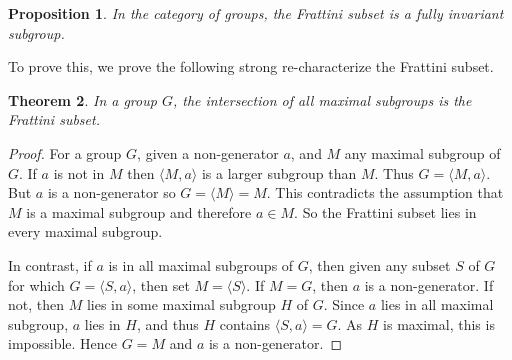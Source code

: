 \documentclass[12pt]{article}
\newtheorem{thm}{Theorem}
\newtheorem{prop}[thm]{Proposition}
\begin{document}
\begin{prop}
In the category of groups, the Frattini subset is a fully invariant subgroup.
\end{prop}

To prove this, we prove the following strong re-characterize the Frattini subset.
\begin{thm}
In a group $G$, the intersection of all maximal subgroups is the 
Frattini subset.
\end{thm}
\begin{proof}
For a group $G$, given a non-generator $a$, and $M$ any maximal subgroup 
of $G$.  If $a$ is not in $M$ then $\langle M,a\rangle$ is a larger subgroup
than $M$.  Thus $G=\langle M,a\rangle$.  But $a$ is a non-generator so
$G=\langle M\rangle=M$.  This contradicts the assumption that $M$ is a maximal
subgroup and therefore $a\in M$.  So the Frattini subset lies in every
maximal subgroup.

In contrast, if $a$ is in all maximal subgroups of $G$, then given any 
subset $S$ of $G$ for which $G=\langle S,a\rangle$, then set $M=\langle S\rangle$.  If $M=G$, then $a$ is a non-generator.  If not, then $M$ lies
in some maximal subgroup $H$ of $G$.  Since $a$ lies in all maximal subgroup,
$a$ lies in $H$, and thus $H$ contains $\langle S,a\rangle=G$.  As $H$ is
maximal, this is impossible.  Hence $G=M$ and $a$ is a non-generator.
\end{proof}

\end{document}
